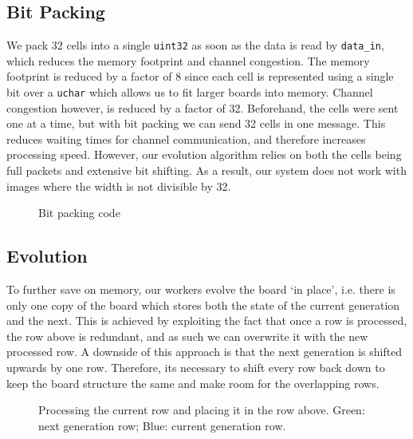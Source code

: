 \documentclass{article}
\begin{document}
    \subsection{Bit Packing}

    We pack 32 cells into a single \verb|uint32| as soon as the data is read by \verb|data_in|, which reduces the memory footprint and channel congestion. The memory footprint is reduced by a factor of 8 since each cell is represented using a single bit over a \verb|uchar| which allows us to fit larger boards into memory. Channel congestion however, is reduced by a factor of 32. Beforehand, the cells were sent one at a time, but with bit packing we can send 32 cells in one message. This reduces waiting times for channel communication, and therefore increases processing speed. However, our evolution algorithm relies on both the cells being full packets and extensive bit shifting. As a result, our system does not work with images where the width is not divisible by 32.
    
    \begin{figure}[h]
        
        \caption{Bit packing code}
        \label{fig:bitpack}
    \end{figure}

    \subsection{Evolution}

    To further save on memory, our workers evolve the board `in place', i.e. there is only one copy of the board which stores both the state of the current generation and the next. This is achieved by exploiting the fact that once a row is processed, the row above is redundant, and as such we can overwrite it with the new processed row. A downside of this approach is that the next generation is shifted upwards by one row. Therefore, its necessary to shift every row back down to keep the board structure the same and make room for the overlapping rows.

    \begin{figure}[h]
        \begin{center}
            
            \caption{Processing the current row and placing it in the row above. Green: next generation row; Blue: current generation row.}
            \label{fig:rows}
        \end{center}
    \end{figure}
\end{document}

